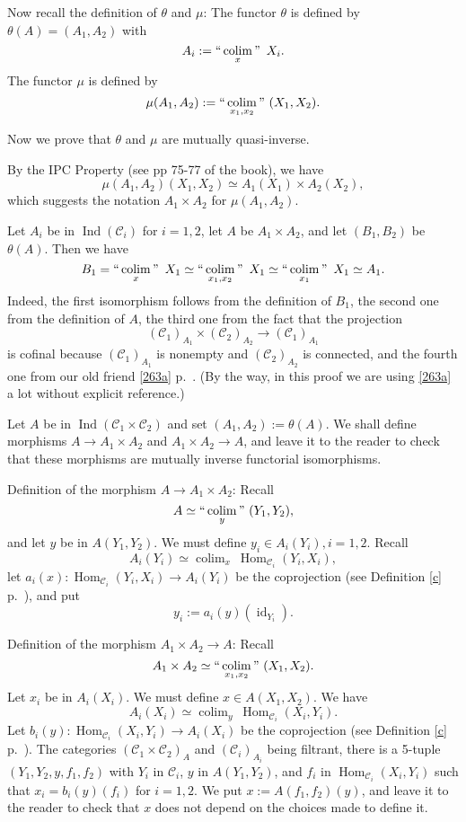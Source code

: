 \documentclass[12pt]{article}
\theoremstyle{remark}%
\newcommand{\C}{\mathcal C}
\DeclareMathOperator*{\coli}{colim}
\DeclareMathOperator*{\co}{colim}
\DeclareMathOperator*{\ic}{``\coli"}
\DeclareMathOperator{\id}{id}
\DeclareMathOperator{\h}{Hom}
\DeclareMathOperator{\Ind}{Ind}
\begin{document}
Now recall the definition of $\theta$ and $\mu$: The functor $\theta$ is defined by $\theta(A)=(A_1,A_2)$ with 
$$
A_i:=\ic_x\ X_i. 
$$ 
The functor $\mu$ is defined by 
$$
\mu(A_1,A_2):=\ic_{x_1,x_2}\ (X_1,X_2). 
$$ 

Now we prove that $\theta$ and $\mu$ are mutually quasi-inverse. 

By the IPC Property (see pp 75-77 of the book), we have 
$$
\mu(A_1,A_2)(X_1,X_2)\simeq A_1(X_1)\times A_2(X_2), 
$$ 
which suggests the notation $A_1\times A_2$ for $\mu(A_1,A_2)$. 

Let $A_i$ be in $\Ind(\C_i)$ for $i=1,2$, let $A$ be $A_1\times A_2$, and let $(B_1,B_2)$ be $\theta(A)$. Then we have 
$$ 
B_1=\ic_x\ X_1\simeq\ic_{x_1,x_2}\ X_1\simeq\ic_{x_1}\ X_1\simeq A_1.
$$ 
Indeed, the first isomorphism follows from the definition of $B_1$, the second one from the definition of $A$, the third one from the fact that the projection 
$$
(\C_1)_{A_1}\times(\C_2)_{A_2}\to(\C_1)_{A_1}
$$ 
is cofinal because $(\C_1)_{A_1}$ is nonempty and $(\C_2)_{A_2}$ is connected, and the fourth one from our old friend \eqref{263a} p.~\pageref{263a}. (By the way, in this proof we are using \eqref{263a} a lot without explicit reference.) 

Let $A$ be in $\Ind(\C_1\times\C_2)$ and set $(A_1,A_2):=\theta(A)$. We shall define morphisms $A\to A_1\times A_2$ and $A_1\times A_2\to A$, and leave it to the reader to check that these morphisms are mutually inverse functorial isomorphisms. 

Definition of the morphism $A\to A_1\times A_2$: Recall 
$$
A\simeq\ic_y\ (Y_1,Y_2), 
$$ 
and let $y$ be in $A(Y_1,Y_2)$. We must define $y_i\in A_i(Y_i),i=1,2$. Recall 
$$
A_i(Y_i)\simeq\co_x\ \h_{\C_i}(Y_i,X_i), 
$$ 
let $a_i(x):\h_{\C_i}(Y_i,X_i)\to A_i(Y_i)$ be the coprojection (see Definition \ref{c} p.~\pageref{c}), and put 
$$
y_i:=a_i(y)(\id_{Y_i}). 
$$ 

Definition of the morphism $A_1\times A_2\to A$: Recall 
$$
A_1\times A_2\simeq\ic_{x_1,x_2}\ (X_1,X_2). 
$$ 
Let $x_i$ be in $A_i(X_i)$. We must define $x\in A(X_1,X_2)$. We have 
$$
A_i(X_i)\simeq\co_y\ \h_{\C_i}(X_i,Y_i). 
$$ 
Let $b_i(y):\h_{\C_i}(X_i,Y_i)\to A_i(X_i)$ be the coprojection (see Definition \ref{c} p.~\pageref{c}). The categories $(\C_1\times\C_2)_A$ and $(\C_i)_{A_i}$ being filtrant, there is a 5-tuple $(Y_1,Y_2,y,f_1,f_2)$ with $Y_i$ in $\C_i$, $y$ in $A(Y_1,Y_2)$, and $f_i$ in $\h_{\C_i}(X_i,Y_i)$ such that $x_i=b_i(y)(f_i)$ for $i=1,2$. We put $x:=A(f_1,f_2)(y)$, and leave it to the reader to check that $x$ does not depend on the choices made to define it. 
%
\end{document}
